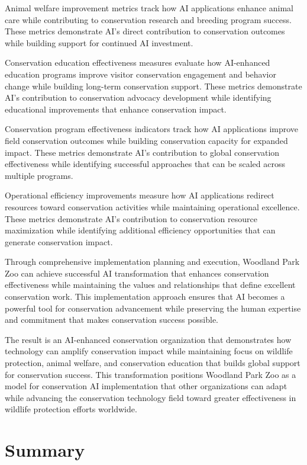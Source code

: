\documentclass[
  Letterpaper,
]{scrbook}
\begin{document}
Animal welfare improvement metrics track how AI applications enhance
animal care while contributing to conservation research and breeding
program success. These metrics demonstrate AI's direct contribution to
conservation outcomes while building support for continued AI
investment.

Conservation education effectiveness measures evaluate how AI-enhanced
education programs improve visitor conservation engagement and behavior
change while building long-term conservation support. These metrics
demonstrate AI's contribution to conservation advocacy development while
identifying educational improvements that enhance conservation impact.

Conservation program effectiveness indicators track how AI applications
improve field conservation outcomes while building conservation capacity
for expanded impact. These metrics demonstrate AI's contribution to
global conservation effectiveness while identifying successful
approaches that can be scaled across multiple programs.

Operational efficiency improvements measure how AI applications redirect
resources toward conservation activities while maintaining operational
excellence. These metrics demonstrate AI's contribution to conservation
resource maximization while identifying additional efficiency
opportunities that can generate conservation impact.

Through comprehensive implementation planning and execution, Woodland
Park Zoo can achieve successful AI transformation that enhances
conservation effectiveness while maintaining the values and
relationships that define excellent conservation work. This
implementation approach ensures that AI becomes a powerful tool for
conservation advancement while preserving the human expertise and
commitment that makes conservation success possible.

The result is an AI-enhanced conservation organization that demonstrates
how technology can amplify conservation impact while maintaining focus
on wildlife protection, animal welfare, and conservation education that
builds global support for conservation success. This transformation
positions Woodland Park Zoo as a model for conservation AI
implementation that other organizations can adapt while advancing the
conservation technology field toward greater effectiveness in wildlife
protection efforts worldwide.


\chapter*{Summary}\label{summary}
\end{document}
